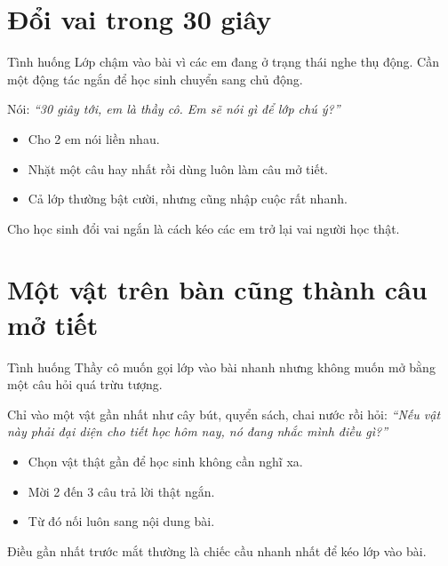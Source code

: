 \section{Đổi vai trong 30 giây}
\begin{tinhhuong}{Tình huống}
Lớp chậm vào bài vì các em đang ở trạng thái nghe thụ động. Cần một động tác ngắn để học sinh chuyển sang chủ động.
\end{tinhhuong}
\begin{goiydungngay}
Nói: \textit{``30 giây tới, em là thầy cô. Em sẽ nói gì để lớp chú ý?''}
\begin{itemize}
\item Cho 2 em nói liền nhau.
\item Nhặt một câu hay nhất rồi dùng luôn làm câu mở tiết.
\item Cả lớp thường bật cười, nhưng cũng nhập cuộc rất nhanh.
\end{itemize}
\end{goiydungngay}
\begin{cauchot}
Cho học sinh đổi vai ngắn là cách kéo các em trở lại vai người học thật.
\end{cauchot}
\ngancach

\section{Một vật trên bàn cũng thành câu mở tiết}
\begin{tinhhuong}{Tình huống}
Thầy cô muốn gọi lớp vào bài nhanh nhưng không muốn mở bằng một câu hỏi quá trừu tượng.
\end{tinhhuong}
\begin{goiydungngay}
Chỉ vào một vật gần nhất như cây bút, quyển sách, chai nước rồi hỏi: \textit{``Nếu vật này phải đại diện cho tiết học hôm nay, nó đang nhắc mình điều gì?''}
\begin{itemize}
\item Chọn vật thật gần để học sinh không cần nghĩ xa.
\item Mời 2 đến 3 câu trả lời thật ngắn.
\item Từ đó nối luôn sang nội dung bài.
\end{itemize}
\end{goiydungngay}
\begin{cauchot}
Điều gần nhất trước mắt thường là chiếc cầu nhanh nhất để kéo lớp vào bài.
\end{cauchot}
\ngancach

